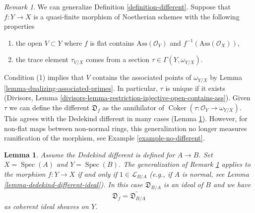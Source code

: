 \documentclass{stacks-project}
\theoremstyle{plain}
\newtheorem{lemma}[subsection]{Lemma}
\theoremstyle{definition}
\theoremstyle{remark}
\newtheorem{remark}[subsection]{Remark}
\numberwithin{equation}{subsection}
\def\Spec{\mathop{\mathrm{Spec}}}
\def\Coker{\mathop{\mathrm{Coker}}}
\begin{document}
\begin{remark}
\label{remark-different-generalization}
We can generalize Definition \ref{definition-different}.
Suppose that $f : Y \to X$ is a quasi-finite morphism of Noetherian schemes
with the following properties
\begin{enumerate}
\item the open $V \subset Y$ where $f$ is flat contains
$\text{Ass}(\mathcal{O}_Y)$ and $f^{-1}(\text{Ass}(\mathcal{O}_X))$,
\item the trace element $\tau_{V/X}$ comes from a section
$\tau \in \Gamma(Y, \omega_{Y/X})$.
\end{enumerate}
Condition (1) implies that $V$ contains the associated points of
$\omega_{Y/X}$ by Lemma \ref{lemma-dualizing-associated-primes}.
In particular, $\tau$ is unique if it exists
(Divisors, Lemma \ref{divisors-lemma-restriction-injective-open-contains-ass}).
Given $\tau$ we can define the different $\mathfrak{D}_f$ as the annihilator of
$\Coker(\tau : \mathcal{O}_Y \to \omega_{Y/X})$. This agrees with the
Dedekind different in many cases (Lemma \ref{lemma-agree-dedekind}).
However, for non-flat maps between non-normal rings, this generalization
no longer measures ramification of the morphism, see
Example \ref{example-no-different}.
\end{remark}

\begin{lemma}
\label{lemma-agree-dedekind}
Assume the Dedekind different is defined for $A \to B$.
Set $X = \Spec(A)$ and $Y = \Spec(B)$. The generalization of
Remark \ref{remark-different-generalization}
applies to the morphism $f : Y \to X$ if and only if
$1 \in \mathcal{L}_{B/A}$ (e.g., if $A$ is normal, see
Lemma \ref{lemma-dedekind-different-ideal}).
In this case $\mathfrak{D}_{B/A}$ is an ideal of $B$ and we have
$$
\mathfrak{D}_f = \widetilde{\mathfrak{D}_{B/A}}
$$
as coherent ideal sheaves on $Y$.
\end{lemma}
\end{document}
